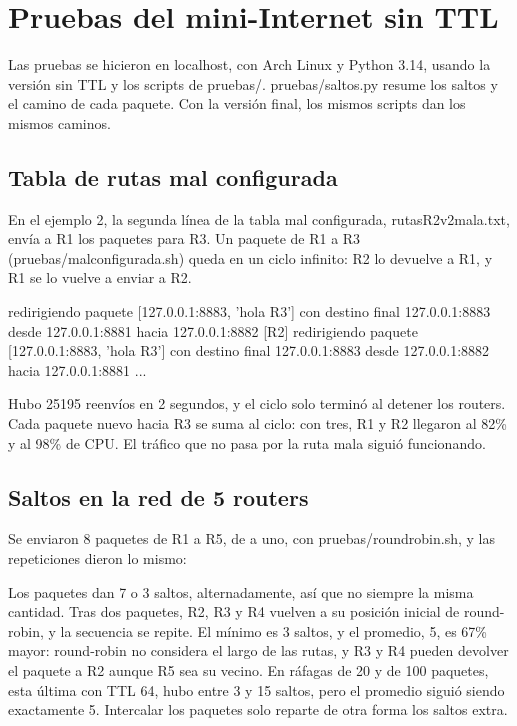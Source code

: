 \documentclass[
	spanish, %
	letterpaper, oneside
]{article}
\newcommand{\codeunderscore}{\textunderscore\allowbreak}
\newcommand{\code}[1]{{\let\_\codeunderscore#1}}     %
\begin{document}
\section{Pruebas del mini-Internet sin TTL}
\label{sec:pruebas-sin-ttl}
Las pruebas se hicieron en localhost, con Arch Linux y Python 3.14, usando la versión sin TTL y los scripts de \code{pruebas/}. \code{pruebas/saltos.py} resume los saltos y el camino de cada paquete. Con la versión final, los mismos scripts dan los mismos caminos.

\subsection{Tabla de rutas mal configurada}
\label{sec:mal-configurada}
En el ejemplo 2, la segunda línea de la tabla mal configurada, \code{rutas\_R2\_v2\_mala.txt}, envía a R1 los paquetes para R3. Un paquete de R1 a R3 (\code{pruebas/mal\_configurada.sh}) queda en un ciclo infinito: R2 lo devuelve a R1, y R1 se lo vuelve a enviar a R2.
\begin{salida}
[R1] redirigiendo paquete [127.0.0.1:8883, 'hola R3'] con destino final 127.0.0.1:8883 desde 127.0.0.1:8881 hacia 127.0.0.1:8882
[R2] redirigiendo paquete [127.0.0.1:8883, 'hola R3'] con destino final 127.0.0.1:8883 desde 127.0.0.1:8882 hacia 127.0.0.1:8881
...
\end{salida}
Hubo 25195 reenvíos en 2 segundos, y el ciclo solo terminó al detener los routers. Cada paquete nuevo hacia R3 se suma al ciclo: con tres, R1 y R2 llegaron al 82\% y al 98\% de CPU. El tráfico que no pasa por la ruta mala siguió funcionando.

\subsection{Saltos en la red de 5 routers}
Se enviaron 8 paquetes de R1 a R5, de a uno, con \code{pruebas/round\_robin.sh}, y las repeticiones dieron lo mismo:
Los paquetes dan 7 o 3 saltos, alternadamente, así que no siempre la misma cantidad. Tras dos paquetes, R2, R3 y R4 vuelven a su posición inicial de round-robin, y la secuencia se repite. El mínimo es 3 saltos, y el promedio, 5, es 67\% mayor: round-robin no considera el largo de las rutas, y R3 y R4 pueden devolver el paquete a R2 aunque R5 sea su vecino. En ráfagas de 20 y de 100 paquetes, esta última con TTL 64, hubo entre 3 y 15 saltos, pero el promedio siguió siendo exactamente 5. Intercalar los paquetes solo reparte de otra forma los saltos extra.
\end{document}
